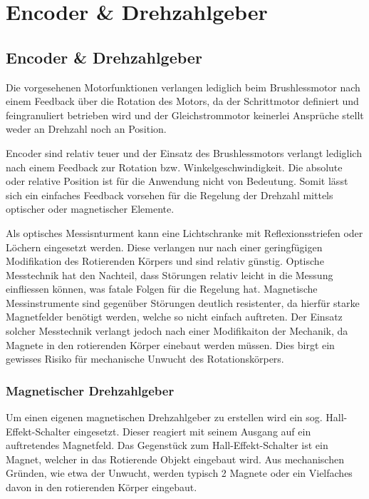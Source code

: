 \ifSTANDALONE
\section{Encoder \& Drehzahlgeber}
\fi
\ifEMBED
\subsection{Encoder \& Drehzahlgeber}
\fi

Die vorgesehenen Motorfunktionen verlangen lediglich beim Brushlessmotor
nach einem Feedback über die Rotation des Motors, da der Schrittmotor
definiert und feingranuliert betrieben wird und der Gleichstrommotor
keinerlei Ansprüche stellt weder an Drehzahl noch an Position.

Encoder sind relativ teuer und der Einsatz des Brushlessmotors verlangt
lediglich nach einem Feedback zur Rotation bzw. Winkelgeschwindigkeit.
Die absolute oder relative Position ist für die Anwendung nicht von
Bedeutung. Somit lässt sich ein einfaches Feedback vorsehen für die
Regelung der Drehzahl mittels optischer oder magnetischer Elemente.

Als optisches Messisnturment kann eine Lichtschranke mit 
Reflexionsstriefen oder Löchern eingesetzt werden. Diese verlangen
nur nach einer geringfügigen Modifikation des Rotierenden Körpers und
sind relativ günstig. Optische Messtechnik hat den Nachteil, dass
Störungen relativ leicht in die Messung einfliessen können, was fatale
Folgen für die Regelung hat. Magnetische Messinstrumente sind gegenüber
Störungen deutlich resistenter, da hierfür starke Magnetfelder benötigt
werden, welche so nicht einfach auftreten. Der Einsatz solcher Messtechnik
verlangt jedoch nach einer Modifikaiton der Mechanik, da Magnete in den
rotierenden Körper einebaut werden müssen. Dies birgt ein gewisses
Risiko für mechanische Unwucht des Rotationskörpers.

\subsubsection{Magnetischer Drehzahlgeber}
Um einen eigenen magnetischen Drehzahlgeber zu erstellen wird ein
sog. Hall-Effekt-Schalter eingesetzt. Dieser reagiert mit seinem Ausgang
auf ein auftretendes Magnetfeld. Das Gegenstück zum Hall-Effekt-Schalter
ist ein Magnet, welcher in das Rotierende Objekt eingebaut wird. Aus 
mechanischen Gründen, wie etwa der Unwucht, werden typisch 2 Magnete
oder ein Vielfaches davon in den rotierenden Körper eingebaut.

